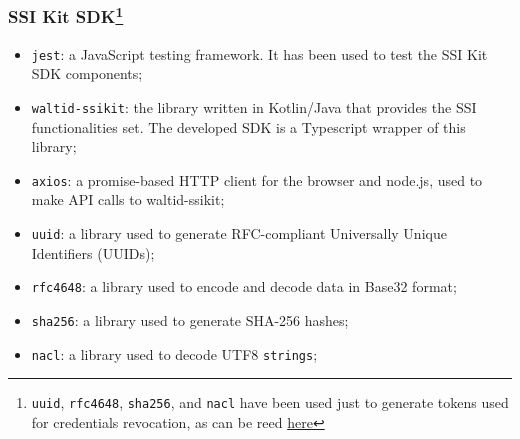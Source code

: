 \subsubsection[SSI Kit SDK]{SSI Kit SDK\footnote{\texttt{uuid}, \texttt{rfc4648}, 
\texttt{sha256}, and \texttt{nacl} have been used just to generate tokens used for 
credentials revocation, as can be reed \hyperref[method:isRevoked]{here}}}

\begin{itemize}
    \setlength\itemsep{-0.1em}
    \item \texttt{jest}: a JavaScript testing framework. It has been used to test
    the SSI Kit SDK components;
    \item \texttt{waltid-ssikit}: the library written in Kotlin/Java that provides 
    the SSI functionalities set. The developed SDK is a Typescript wrapper of this 
    library;
    \item \texttt{axios}: a promise-based HTTP client for the browser and node.js,
    used to make API calls to waltid-ssikit;
    \item \texttt{uuid}: a library used to generate RFC-compliant Universally Unique
    Identifiers (UUIDs);
    \item \texttt{rfc4648}: a library used to encode and decode data in Base32 format;
    \item \texttt{sha256}: a library used to generate SHA-256 hashes;
    \item \texttt{nacl}: a library used to decode UTF8 \texttt{strings};
\end{itemize}


